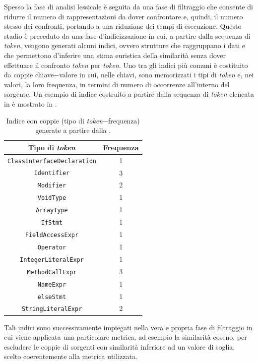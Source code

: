 Spesso la fase di analisi lessicale è seguita da una fase di filtraggio che consente di ridurre il numero di rappresentazioni da dover confrontare e, quindi, il numero stesso dei confronti, portando a una riduzione dei tempi di esecuzione.
%
Questo stadio è preceduto da una fase d'indicizzazione in cui, a partire dalla sequenza di \textit{token}, vengono generati alcuni indici, ovvero strutture che raggruppano i dati e che permettono d'inferire una stima euristica della similarità senza dover effettuare il confronto \textit{token} per \textit{token}.
%
Uno tra gli indici più comuni è costituito da coppie chiave$-$valore in cui, nelle chiavi, sono memorizzati i tipi di \textit{token} e, nei valori, la loro frequenza, in termini di numero di occorrenze all'interno del sorgente.
%
Un esempio di indice costruito a partire dalla sequenza di \textit{token} elencata in  è mostrato in .
%
\begin{table}[h!]
    \centering
    \begin{tabular}{|c|c|} 
        \hline
        \textbf{Tipo di \textit{token}} & \textbf{Frequenza} \\ [0.5ex] 
        \hline\hline
        \texttt{ClassInterfaceDeclaration}  & 1 \\ \hline
        \texttt{Identifier}                 & 3 \\ \hline
        \texttt{Modifier}                   & 2 \\ \hline
        \texttt{VoidType}                   & 1 \\ \hline
        \texttt{ArrayType}                  & 1 \\ \hline
        \texttt{IfStmt}                     & 1 \\ \hline
        \texttt{FieldAccessExpr}            & 1 \\ \hline
        \texttt{Operator}                   & 1 \\ \hline
        \texttt{IntegerLiteralExpr}         & 1 \\ \hline
        \texttt{MethodCallExpr}             & 3 \\ \hline
        \texttt{NameExpr}                   & 1 \\ \hline
        \texttt{elseStmt}                   & 1 \\ \hline
        \texttt{StringLiteralExpr}          & 2 \\ \hline
    \end{tabular}
    \caption{Indice con coppie (tipo di \textit{token}$-$frequenza) generate a partire dalla .}
    \label{table:token-indexing}
\end{table}
%
Tali indici sono successivamente impiegati nella vera e propria fase di filtraggio in cui viene applicata una particolare metrica, ad esempio la similarità coseno, per escludere le coppie di sorgenti con similarità inferiore ad un valore di soglia, scelto coerentemente alla metrica utilizzata.

